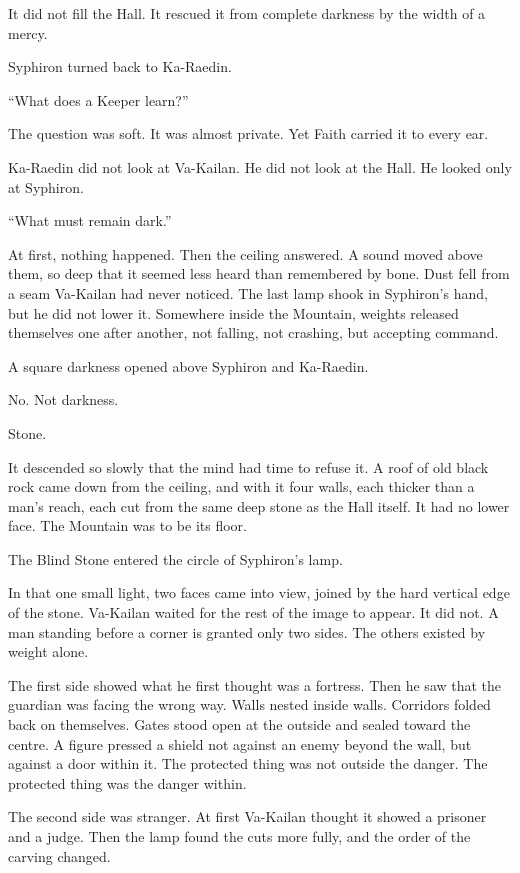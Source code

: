It did not fill the Hall.
It rescued it from complete darkness by the width of a mercy.\par
Syphiron turned back to Ka-Raedin.\par
“What does a Keeper learn?”\par
The question was soft.
It was almost private.
Yet Faith carried it to every ear.\par
Ka-Raedin did not look at Va-Kailan.
He did not look at the Hall.
He looked only at Syphiron.\par
“What must remain dark.”\par
At first, nothing happened.
Then the ceiling answered.
A sound moved above them, so deep that it seemed less heard than remembered by bone.
Dust fell from a seam Va-Kailan had never noticed.
The last lamp shook in Syphiron’s hand, but he did not lower it.
Somewhere inside the Mountain, weights released themselves one after another, not falling, not crashing, but accepting command.\par
A square darkness opened above Syphiron and Ka-Raedin.\par
No.
Not darkness.\par
Stone.\par
It descended so slowly that the mind had time to refuse it.
A roof of old black rock came down from the ceiling, and with it four walls, each thicker than a man’s reach, each cut from the same deep stone as the Hall itself.
It had no lower face.
The Mountain was to be its floor.\par
The Blind Stone entered the circle of Syphiron’s lamp.\par
In that one small light, two faces came into view, joined by the hard vertical edge of the stone.
Va-Kailan waited for the rest of the image to appear.
It did not.
A man standing before a corner is granted only two sides.
The others existed by weight alone.\par
The first side showed what he first thought was a fortress.
Then he saw that the guardian was facing the wrong way.
Walls nested inside walls.
Corridors folded back on themselves.
Gates stood open at the outside and sealed toward the centre.
A figure pressed a shield not against an enemy beyond the wall, but against a door within it.
The protected thing was not outside the danger.
The protected thing was the danger within.\par
The second side was stranger.
At first Va-Kailan thought it showed a prisoner and a judge.
Then the lamp found the cuts more fully, and the order of the carving changed.
